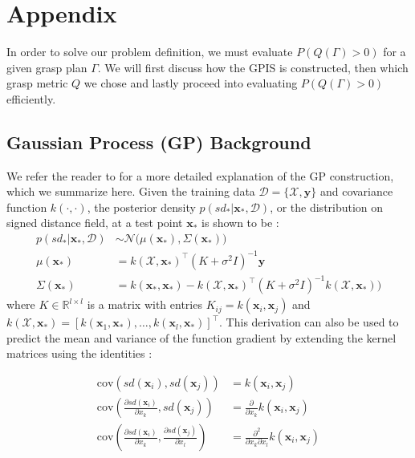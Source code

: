 \documentclass[letterpaper, 10 pt, conference]{ieeeconf}  %
\newcommand{\by}{\mathbf{y}}
\newcommand{\bx}{\mathbf{x}}
\newcommand{\mX}{\mathcal{X}}
\newcommand{\mD}{\mathcal{D}}
\newcommand{\mN}{\mathcal{N}}
\begin{document}




\section{Appendix} \label{sec:Appendix}
 In order to solve our problem definition, we must evaluate $P(Q(\Gamma)>0)$ for a given grasp plan $\Gamma$. We will first discuss how the GPIS is constructed, then which grasp metric $Q$ we chose and lastly proceed into evaluating $P(Q(\Gamma)>0)$ efficiently. 


\subsection{Gaussian Process (GP) Background}\label{sec:GP}
We refer the reader to \cite{mahler2015opt} for a more detailed explanation of the GP construction, which we summarize here.  Given the training data $\mD = \{\mX, \by\}$ and covariance function $k(\cdot,\cdot)$, the posterior density $p(sd_*|\bx_*,\mD)$, or the distribution on signed distance field, at a test point $\bx_{*}$ is shown to be \cite{rasmussen2010gaussian}:
\begin{align*}
	p(sd_*|\bx_*,\mD) &\sim \mN\big(\mu(\bx_*), \Sigma(\bx_*)\big) \\
	\mu(\bx_*) &= k(\mX,\bx_*)^{\intercal}(K + \sigma^2I)^{-1}\by \\
	\Sigma(\bx_*) &= k(\bx_*,\bx_*)-k(\mX,\bx_*)^{\intercal}(K+\sigma^2I)^{-1}k(\mX,\bx_*)\big) 
\end{align*}
where $K \in \mathbb{R}^{l \times l}$ is a matrix with entries $K_{ij} = k(\bx_i,\bx_j)$ and $k(\mX,\bx_*) = [k(\bx_1,\bx_*),\ldots,k(\bx_l,\bx_*)]^{\intercal}$. 
This derivation can also be used to predict the mean and variance of the function gradient by extending the kernel matrices using the identities \cite{solak2003derivative}:

\vspace{-2ex}
\begin{align}
	\text{cov}\left(sd(\bx_i), sd(\bx_j) \right) &=  k(\bx_i, \bx_j) \\
	\text{cov}\left(\frac{\partial sd (\bx_i)}{\partial x_k}, sd(\bx_j) \right) &= \frac{\partial}{\partial x_k} k(\bx_i, \bx_j) \label{eq:mean_gradient}\\
	\text{cov}\left(\frac{\partial sd (\bx_i)}{\partial x_k}, \frac{\partial sd (\bx_j)}{\partial x_l} \right) &= \frac{\partial^2}{\partial x_k \partial x_l} k(\bx_i, \bx_j)\label{eq:cov_gradient}
\end{align}
\end{document}
